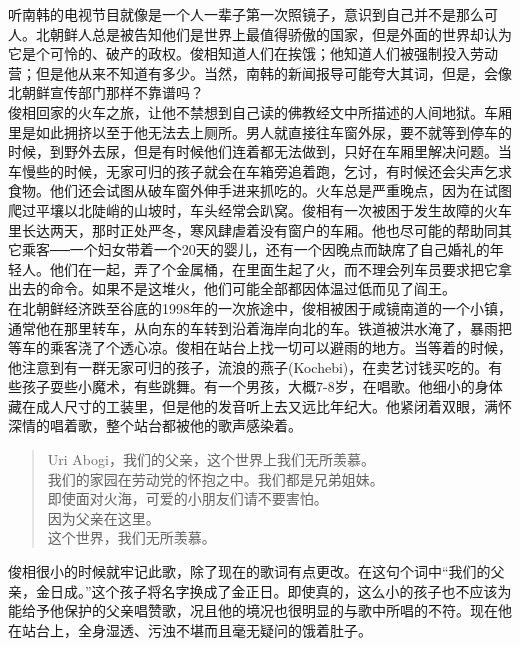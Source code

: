 听南韩的电视节目就像是一个人一辈子第一次照镜子，意识到自己并不是那么可人。北朝鲜人总是被告知他们是世界上最值得骄傲的国家，但是外面的世界却认为它是个可怜的、破产的政权。俊相知道人们在挨饿；他知道人们被强制投入劳动营；但是他从来不知道有多少。当然，南韩的新闻报导可能夸大其词，但是，会像北朝鲜宣传部门那样不靠谱吗？\\

俊相回家的火车之旅，让他不禁想到自己读的佛教经文中所描述的人间地狱。车厢里是如此拥挤以至于他无法去上厕所。男人就直接往车窗外尿，要不就等到停车的时候，到野外去尿，但是有时候他们连着都无法做到，只好在车厢里解决问题。当车慢些的时候，无家可归的孩子就会在车箱旁追着跑，乞讨，有时候还会尖声乞求食物。他们还会试图从破车窗外伸手进来抓吃的。火车总是严重晚点，因为在试图爬过平壤以北陡峭的山坡时，车头经常会趴窝。俊相有一次被困于发生故障的火车里长达两天，那时正处严冬，寒风肆虐着没有窗户的车厢。他也尽可能的帮助同其它乘客──一个妇女带着一个20天的婴儿，还有一个因晚点而缺席了自己婚礼的年轻人。他们在一起，弄了个金属桶，在里面生起了火，而不理会列车员要求把它拿出去的命令。如果不是这堆火，他们可能全部都因体温过低而见了阎王。\\

在北朝鲜经济跌至谷底的1998年的一次旅途中，俊相被困于咸镜南道的一个小镇，通常他在那里转车，从向东的车转到沿着海岸向北的车。铁道被洪水淹了，暴雨把等车的乘客浇了个透心凉。俊相在站台上找一切可以避雨的地方。当等着的时候，他注意到有一群无家可归的孩子，流浪的燕子(Kochebi)，在卖艺讨钱买吃的。有些孩子耍些小魔术，有些跳舞。有一个男孩，大概7-8岁，在唱歌。他细小的身体藏在成人尺寸的工装里，但是他的发音听上去又远比年纪大。他紧闭着双眼，满怀深情的唱着歌，整个站台都被他的歌声感染着。\\

\begin{quote}
	Uri Abogi，我们的父亲，这个世界上我们无所羡慕。\\

	我们的家园在劳动党的怀抱之中。我们都是兄弟姐妹。\\

	即使面对火海，可爱的小朋友们请不要害怕。\\

	因为父亲在这里。\\

	这个世界，我们无所羡慕。\\
\end{quote}

俊相很小的时候就牢记此歌，除了现在的歌词有点更改。在这句个词中“我们的父亲，金日成。”这个孩子将名字换成了金正日。即使真的，这么小的孩子也不应该为能给予他保护的父亲唱赞歌，况且他的境况也很明显的与歌中所唱的不符。现在他在站台上，全身湿透、污浊不堪而且毫无疑问的饿着肚子。\\

